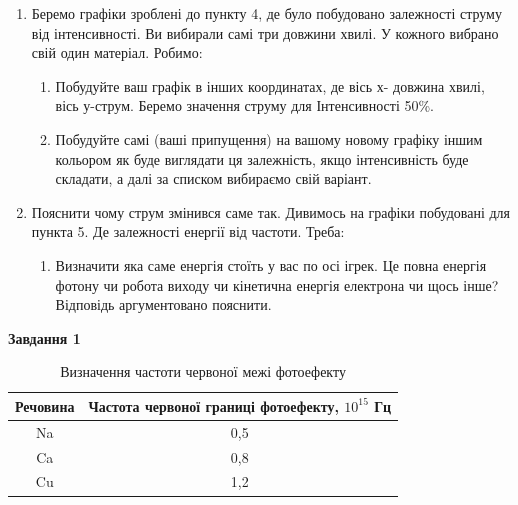 \documentclass[a4paper,14pt]{extreport}
\begin{document}
\begin{enumerate}
		\item Беремо  графіки зроблені до пункту 4, де було побудовано залежності струму від інтенсивності. Ви вибирали самі три довжини хвилі. У кожного вибрано свій один матеріал. Робимо:
		\begin{enumerate}[label=2.\arabic*]
			\item Побудуйте ваш графік в інших координатах, де вісь х- довжина хвилі, вісь у-струм. Беремо значення струму для Інтенсивності 50\%.
			\item Побудуйте самі (ваші припущення) на вашому новому графіку іншим кольором як буде виглядати ця залежність, якщо інтенсивність буде складати, а далі за списком вибираємо свій варіант.
		\end{enumerate}
		\item Пояснити чому струм змінився саме так. Дивимось на графіки побудовані для пункта 5. Де залежності енергії від частоти. Треба:
		\begin{enumerate}[label=3.\arabic*]
			\item Визначити яка саме енергія стоїть у вас по осі ігрек. Це повна енергія фотону чи робота виходу чи кінетична енергія електрона чи щось інше? Відповідь аргументовано пояснити.
		\end{enumerate}
\end{enumerate}
\newpage
	
\textbf{Завдання 1}
	\begin{table}[h!]
		\begin{center}
			\caption{Визначення частоти червоної межі фотоефекту}
			\begin{tabular}{|c|c|}
			\hline
			Речовина & Частота червоної границі фотоефекту, $10^{15}$ Гц \\ \hline
			Na                & 0,5                        \\ \hline
			Ca                & 0,8                          \\ \hline
			Cu                & 1,2                        \\ \hline
			\end{tabular}
			\label{tab2}
		\end{center}
	\end{table}

	
\end{document}
